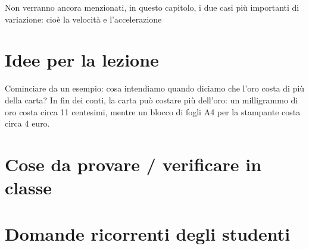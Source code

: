 \documentclass[11pt]{report}
\begin{document}
Non verranno ancora menzionati, in questo capitolo, i due casi più importanti di variazione: cioè la velocità e l'accelerazione

\section*{Idee per la lezione}
Cominciare da un esempio: cosa intendiamo quando diciamo che l'oro costa di più della carta? In fin dei conti, la carta può costare più dell'oro: un milligrammo di oro costa circa 11 centesimi, mentre un blocco di fogli A4 per la stampante costa circa 4 euro.


\section*{Cose da provare / verificare in classe}

\section*{Domande ricorrenti degli studenti}
\end{document}
